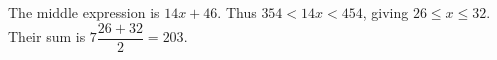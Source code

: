 The middle expression is $14x+46$. Thus $354<14x<454$, giving $26\le x\le 32$. Their sum is $7\dfrac{26+32}{2}=\boxed{203}$.
